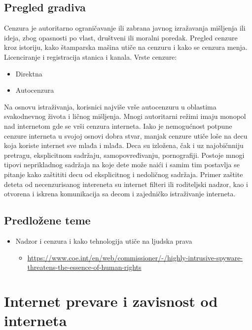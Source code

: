 \documentclass[a4paper,12pt]{article}
\begin{document}
\subsection{Pregled gradiva}
Cenzura je autoritarno ograničavanje ili zabrana javnog izražavanja mišljenja ili ideja, zbog opasnosti po vlast, društveni ili moralni poredak.
Pregled cenzure kroz istoriju, kako štamparska mašina utiče na cenzuru i kako se cenzura menja. Licenciranje i registracija stanica i kanala.
Vrste cenzure: 
\begin{itemize}
    \item Direktna
    \item Autocenzura
\end{itemize}
Na osnovu istraživanja, korisnici najviše vrše autocenzuru u oblastima svakodnevnog života i ličnog mišljenja. Mnogi autoritarni režimi imaju monopol nad internetom gde se vrši cenzura interneta. Iako je nemogućnost potpune cenzure interneta u svojoj osnovi dobra stvar, manjak cenzure utiče loše na decu koja koriste internet sve mlađa i mlađa. Deca su izložena, čak i uz najobičnniju pretragu, eksplicitnom sadržaju, samopovređivanju, pornografiji. 
Postoje mnogi tipovi neprikladnog sadržaja na koje dete može naići i samim tim postavlja se pitanje kako zaštititi decu od eksplicitnog i nedoličnog sadržaja. Primer zaštite deteta od necenzurisanog intereneta su internet filteri ili roditeljski nadzor, kao i otvorena i iskrena komunikacija sa decom i zajedničko istraživanje interneta.
\subsection{Predložene teme}
\begin{itemize}
    \item Nadzor i cenzura i kako tehnologija utiče na ljudska prava
    \begin{itemize}
        \item \url{https://www.coe.int/en/web/commissioner/-/highly-intrusive-spyware-threatens-the-essence-of-human-rights}
    \end{itemize}
\end{itemize}
\section{Internet prevare i zavisnost od interneta}
\end{document}
